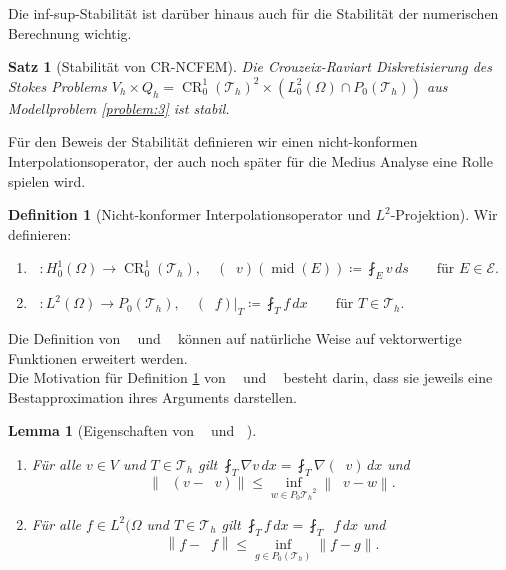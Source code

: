 \documentclass[a4paper]{scrartcl}
\newcommand{\Hzero}{H_0^1}
\newcommand{\Ltwo}{L^2}
\newcommand{\crfem}{\operatorname{CR}_0^1}
\newcommand{\mesh}{\mathcal{T}_h}
\newcommand{\edges}{\mathcal{E}}
\newcommand{\dx}{\,dx}
\newcommand{\norm}[1]{\left\lVert#1\right\rVert}
\DeclareMathOperator{\nablah}{\nabla_{\textit{h}}}
\DeclareMathOperator{\midOp}{mid}
\DeclareMathOperator{\intOp}{I_{NC}}
\DeclareMathOperator{\LtwoOp}{\Pi_0}
\theoremstyle{plain}
\newtheorem{theorem}{Satz}
\newtheorem{lemma}{Lemma}
\theoremstyle{definition}
\newtheorem{definition}{Definition}
\theoremstyle{remark}
\begin{document}
\noindent Die inf-sup-Stabilität ist darüber hinaus auch für die
Stabilität der numerischen Berechnung wichtig. 

\begin{theorem}[Stabilität von CR-NCFEM]\label{thm:3}
  Die Crouzeix-Raviart Diskretisierung des Stokes Problems \(V_h \times Q_h =
  \crfem(\mesh)^2 \times (\Ltwo_0(\Omega)\cap P_0(\mesh))\) aus
  Modellproblem \ref{problem:3}  ist stabil. 
\end{theorem}

\noindent Für den Beweis der Stabilität definieren wir einen
nicht-konformen Interpolationsoperator, der auch noch später für die
Medius Analyse eine Rolle spielen wird.  

\begin{definition}[Nicht-konformer Interpolationsoperator und
  \(\Ltwo\)-Projektion] \label{def:2}
  Wir definieren: 
  \begin{enumerate}[label=\emph{(\roman*)}]
  \item \( \intOp\colon \Hzero(\Omega) \rightarrow \crfem(\mesh), \quad
      (\intOp v)(\midOp(E)) \coloneqq \fint_E v \,ds \qquad \text{für } E \in \edges.\)  
  \item \(\LtwoOp \colon \Ltwo(\Omega) \rightarrow P_0(\mesh), \quad 
      (\LtwoOp f)|_T \coloneqq \fint_T f \dx \qquad \text{für } T\in \mesh.\) 
    \end{enumerate}
\end{definition}

\noindent Die Definition von \(\intOp\) und \(\LtwoOp\) können auf natürliche
Weise auf vektorwertige Funktionen erweitert werden. \\ 

\noindent Die Motivation für Definition \ref{def:2} von \(\intOp\) und
\(\LtwoOp\) besteht darin, dass sie jeweils eine Bestapproximation
ihres Arguments darstellen. 

\begin{lemma}[Eigenschaften von \(\intOp\) und \(\LtwoOp\)] \label{lem:1}
  \begin{enumerate}[label=(\roman*)]
  \item Für alle \(v\in V\) und \(T\in \mesh\) gilt \(\fint_T \nabla v
    \dx = \fint_T \nabla(\intOp v) \dx\) und 
    \begin{equation}
      \label{eq:16}
      \norm{\nablah(v-\intOp v)} \leq \inf_{w\in P_0{\mesh}^2} \norm{\nablah v - w}.
    \end{equation}
  \item Für alle \(f\in \Ltwo(\Omega\) und \(T\in \mesh\) gilt
    \(\fint_T f \dx = \fint_T \LtwoOp f \dx\) und 
    \begin{equation}
      \label{eq:17}
      \norm{f-\LtwoOp f} \leq \inf_{g\in P_0(\mesh)}\norm{f-g}. 
    \end{equation}
  \end{enumerate}
\end{lemma}
\end{document}
